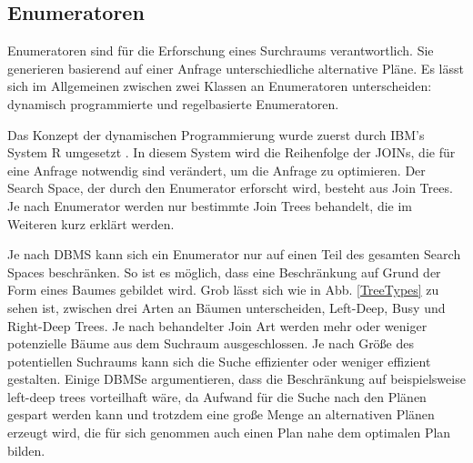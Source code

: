 \subsection{Enumeratoren}



Enumeratoren sind für die Erforschung eines Surchraums verantwortlich. Sie generieren basierend auf einer Anfrage unterschiedliche alternative Pläne. Es lässt sich im Allgemeinen zwischen zwei Klassen an Enumeratoren unterscheiden: dynamisch programmierte und regelbasierte Enumeratoren.  

Das Konzept der dynamischen Programmierung wurde zuerst durch IBM's System R umgesetzt \cite{selinger1979access}. In diesem System wird die Reihenfolge der JOINs, die für eine Anfrage notwendig sind verändert, um die Anfrage zu optimieren. Der Search Space, der durch den Enumerator erforscht wird, besteht aus Join Trees. Je nach Enumerator werden nur bestimmte Join Trees behandelt, die im Weiteren kurz erklärt werden.

Je nach \ac{DBMS} kann sich ein Enumerator nur auf einen Teil des gesamten Search Spaces beschränken. So ist es möglich, dass eine Beschränkung auf Grund der Form eines Baumes gebildet wird. Grob lässt sich wie in Abb. \ref{TreeTypes} zu sehen ist, zwischen drei Arten an Bäumen unterscheiden, Left-Deep, Busy und Right-Deep Trees. Je nach behandelter Join Art werden mehr oder weniger potenzielle Bäume aus dem Suchraum ausgeschlossen. Je nach Größe des potentiellen Suchraums kann sich die Suche effizienter oder weniger effizient gestalten. Einige \ac{DBMS}e argumentieren, dass die Beschränkung auf beispielsweise left-deep trees vorteilhaft wäre, da Aufwand für die Suche nach den Plänen gespart werden kann und trotzdem eine große Menge an alternativen Plänen erzeugt wird, die für sich genommen auch einen Plan nahe dem optimalen Plan bilden. 
